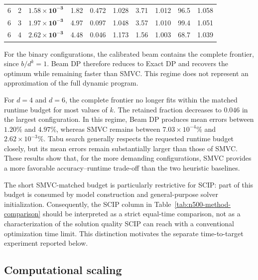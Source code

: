 \documentclass[%
 reprint,
 amsmath,amssymb,
 aps,
 pra,showkeys,
]{revtex4-2}
\begin{document}
\begin{table}[t]
\begin{tabular*}{\textwidth}{
        @{\extracolsep{\fill}}ccrrrrrrrr@{}
    }
        \midrule

        6 & 2 &
        $\mathbf{1.58\times10^{-3}}$ &
        1.82 &
        0.472 &
        1.028 &
        3.71 &
        1.012 &
        96.5 &
        1.058 \\

        6 & 3 &
        $\mathbf{1.97\times10^{-3}}$ &
        4.97 &
        0.097 &
        1.048 &
        3.57 &
        1.010 &
        99.4 &
        1.051 \\

        6 & 4 &
        $\mathbf{2.62\times10^{-3}}$ &
        4.48 &
        0.046 &
        1.173 &
        1.56 &
        1.003 &
        68.7 &
        1.039 \\

        \bottomrule
    \end{tabular*}
\end{table}

For the binary configurations, the calibrated beam contains the complete
frontier, since $b/d^k=1$. Beam DP therefore reduces to Exact DP and
recovers the optimum while remaining faster than SMVC. This regime does
not represent an approximation of the full dynamic program.

For $d=4$ and $d=6$, the complete frontier no longer fits within the
matched runtime budget for most values of $k$. The retained fraction
decreases to $0.046$ in the largest configuration. In this regime,
Beam DP produces mean errors between $1.20\%$ and $4.97\%$, whereas
SMVC remains between $7.03\times10^{-4}\%$ and
$2.62\times10^{-3}\%$. Tabu search generally respects the requested
runtime budget closely, but its mean errors remain substantially larger
than those of SMVC. These results show that, for the more demanding
configurations, SMVC provides a more favorable accuracy--runtime
trade-off than the two heuristic baselines.

The short SMVC-matched budget is particularly restrictive for SCIP:
part of this budget is consumed by model construction and general-purpose
solver initialization. Consequently, the SCIP column in
Table~\ref{tab:n500-method-comparison} should be interpreted as a
strict equal-time comparison, not as a characterization of the
solution quality SCIP can reach with a conventional optimization time
limit. This distinction motivates the separate time-to-target
experiment reported below.

\subsection{Computational scaling}\label{ssec:computational-scaling}
\end{document}
